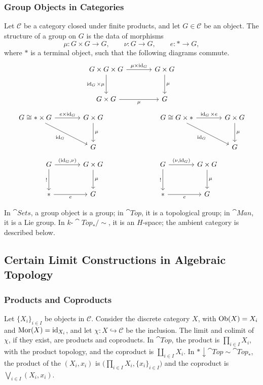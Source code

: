 \documentclass[11pt,a4paper]{article}
\begin{document}
\subsubsection{Group Objects in Categories}
Let $\mathcal C$ be a category closed under finite products, and let
$G\in\mathcal C$ be an object. The structure of a group on $G$ is the data
of morphisms
\[
 \mu\colon G\times G\to G,\qquad \nu\colon G\to G,\qquad e\colon *\to G,
\]
where $*$ is a terminal object, such that the following diagrams commute.
\[
\begin{tikzcd}[row sep=large,column sep=large,cells={nodes={font=\normalsize}}]
G\times G\times G \arrow[r,"\mu\times\id_G"] \arrow[d,"\id_G\times\mu"']
  &G\times G\arrow[d,"\mu"]\\
G\times G\arrow[r,"\mu"']&G
\end{tikzcd}
\]
\[
\begin{tikzcd}[row sep=large,column sep=large,cells={nodes={font=\normalsize}}]
G\cong *\times G \arrow[r,"e\times\id_G"] \arrow[dr,"\id_G"']
  &G\times G\arrow[d,"\mu"]
  &&G\cong G\times * \arrow[r,"\id_G\times e"] \arrow[dr,"\id_G"']
  &G\times G\arrow[d,"\mu"]\\
  &G&&&G
\end{tikzcd}
\]
\[
\begin{tikzcd}[row sep=large,column sep=large,cells={nodes={font=\normalsize}}]
G \arrow[r,"{(\id_G,\nu)}"] \arrow[d,"!"']
  &G\times G\arrow[d,"\mu"]
  &&G \arrow[r,"{(\nu,\id_G)}"] \arrow[d,"!"']
  &G\times G\arrow[d,"\mu"]\\
*\arrow[r,"e"']&G&&*\arrow[r,"e"']&G
\end{tikzcd}
\]
\setcounter{example}{4}\begin{example}
In $\cat{Sets}$, a group object is a group; in $\cat{Top}$, it is a topological
group; in $\cat{Man}$, it is a Lie group. In $k\text{-}\cat{Top}_*/{\sim}$,
it is an $H$-space; the ambient category is described below.
\end{example}
\subsection{Certain Limit Constructions in Algebraic Topology}
\subsubsection{Products and Coproducts}
Let $\{X_i\}_{i\in I}$ be objects in $\mathcal C$. Consider the discrete
category $X$, with $\operatorname{Ob}(X)=X_i$ and $\operatorname{Mor}(X)=\operatorname{id}_{X_i}$, and let
$\chi\colon X\hookrightarrow\mathcal C$ be the inclusion.
The limit and colimit of $\chi$, if they exist, are products and coproducts.
In $\cat{Top}$, the product is $\prod_{i\in I}X_i$, with the product topology,
and the coproduct is $\coprod_{i\in I}X_i$.
In $*\downarrow\cat{Top}\sim\cat{Top}_*$, the product of the $(X_i,x_i)$ is
$\bigl(\prod_{i\in I}X_i,\{x_i\}_{i\in I}\bigr)$ and the coproduct is
$\bigvee_{i\in I}(X_i,x_i)$.
\end{document}
